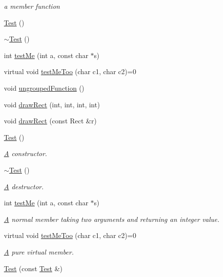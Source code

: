 \begin{DoxyCompactItemize}
\begin{DoxyCompactList}\small\item\em a member function \end{DoxyCompactList}\item 
\hyperlink{class_test_a44e3a28c552193de099601e2910531f1}{Test} ()
\item 
\hyperlink{class_test_a31b169208ad4fc5344a7b6b8e1fd00c1}{$\sim$\-Test} ()
\item 
int \hyperlink{class_test_ab89e4a0d841b51185817c5c7ae739ea4}{test\-Me} (int a, const char $\ast$s)
\item 
virtual void \hyperlink{class_test_ada2b629a324d987f40de6e72196526a5}{test\-Me\-Too} (char c1, char c2)=0
\item 
void \hyperlink{class_test_ae3d5d66760866dc4caf371ccef859ba6}{ungrouped\-Function} ()
\item 
void \hyperlink{class_test_a6b16f6be500388342845646c1969d3aa}{draw\-Rect} (int, int, int, int)
\item 
void \hyperlink{class_test_aadf47113ad9dcd5600cb22e3bcff5258}{draw\-Rect} (const Rect \&r)
\item 
\hyperlink{class_test_a44e3a28c552193de099601e2910531f1}{Test} ()
\begin{DoxyCompactList}\small\item\em \hyperlink{class_a}{A} constructor. \end{DoxyCompactList}\item 
\hyperlink{class_test_a31b169208ad4fc5344a7b6b8e1fd00c1}{$\sim$\-Test} ()
\begin{DoxyCompactList}\small\item\em \hyperlink{class_a}{A} destructor. \end{DoxyCompactList}\item 
int \hyperlink{class_test_ab89e4a0d841b51185817c5c7ae739ea4}{test\-Me} (int a, const char $\ast$s)
\begin{DoxyCompactList}\small\item\em \hyperlink{class_a}{A} normal member taking two arguments and returning an integer value. \end{DoxyCompactList}\item 
virtual void \hyperlink{class_test_ada2b629a324d987f40de6e72196526a5}{test\-Me\-Too} (char c1, char c2)=0
\begin{DoxyCompactList}\small\item\em \hyperlink{class_a}{A} pure virtual member. \end{DoxyCompactList}\item 
\hyperlink{class_test_adcf1bc755df94c4d07519c0a02aa1cc0}{Test} (const \hyperlink{class_test}{Test} \&)
\end{DoxyCompactItemize}
